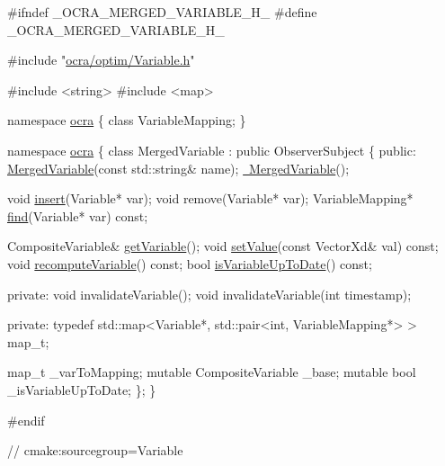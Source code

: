 \begin{DoxyCodeInclude}
\textcolor{preprocessor}{#ifndef \_OCRA\_MERGED\_VARIABLE\_H\_}
\textcolor{preprocessor}{#define \_OCRA\_MERGED\_VARIABLE\_H\_}

\textcolor{preprocessor}{#include "\hyperlink{Variable_8h}{ocra/optim/Variable.h}"}

\textcolor{preprocessor}{#include <string>}
\textcolor{preprocessor}{#include <map>}

\textcolor{keyword}{namespace }\hyperlink{namespaceocra}{ocra}
\{
  \textcolor{keyword}{class }VariableMapping;
\}

\textcolor{keyword}{namespace }\hyperlink{namespaceocra}{ocra}
\{
  \textcolor{keyword}{class }MergedVariable
    : \textcolor{keyword}{public} ObserverSubject
  \{
  \textcolor{keyword}{public}:
    \hyperlink{classocra_1_1MergedVariable_ac6dcd7217ac6a6097ae95f5fe2afc513}{MergedVariable}(\textcolor{keyword}{const} std::string& name);
    \hyperlink{classocra_1_1MergedVariable_aa126050631c068dba3e1d12f31dea9ec}{~MergedVariable}();

    \textcolor{keywordtype}{void} \hyperlink{classocra_1_1MergedVariable_aa91f4ed9514c3dd4bf1ae4e25cf1e118}{insert}(Variable* var);
    \textcolor{keywordtype}{void} \textcolor{keyword}{remove}(Variable* var);
    VariableMapping* \hyperlink{classocra_1_1MergedVariable_a54dea5dde63addca4de73ea8fdb6073b}{find}(Variable* var) \textcolor{keyword}{const};

    CompositeVariable& \hyperlink{classocra_1_1MergedVariable_afa4986407c3fbaebe268fd248b2c4bcf}{getVariable}();
    \textcolor{keywordtype}{void} \hyperlink{classocra_1_1MergedVariable_a2c53faf60a0aa267457aa6688b7341aa}{setValue}(\textcolor{keyword}{const} VectorXd& val) \textcolor{keyword}{const};
    \textcolor{keywordtype}{void} \hyperlink{classocra_1_1MergedVariable_a5edb99e2c6596addb6b5a1c991f79699}{recomputeVariable}() \textcolor{keyword}{const};
    \textcolor{keywordtype}{bool} \hyperlink{classocra_1_1MergedVariable_a1da61e970d1c32c9ad94da57914d5aeb}{isVariableUpToDate}() \textcolor{keyword}{const};

  \textcolor{keyword}{private}:
    \textcolor{keywordtype}{void} invalidateVariable();
    \textcolor{keywordtype}{void} invalidateVariable(\textcolor{keywordtype}{int} timestamp);

  \textcolor{keyword}{private}:
    \textcolor{keyword}{typedef} std::map<Variable*, std::pair<int, VariableMapping*> > map\_t;

    map\_t \_varToMapping;
    \textcolor{keyword}{mutable} CompositeVariable \_base;
    \textcolor{keyword}{mutable} \textcolor{keywordtype}{bool} \_isVariableUpToDate;
  \};
\}

\textcolor{preprocessor}{#endif}

\textcolor{comment}{// cmake:sourcegroup=Variable}
\end{DoxyCodeInclude}
 